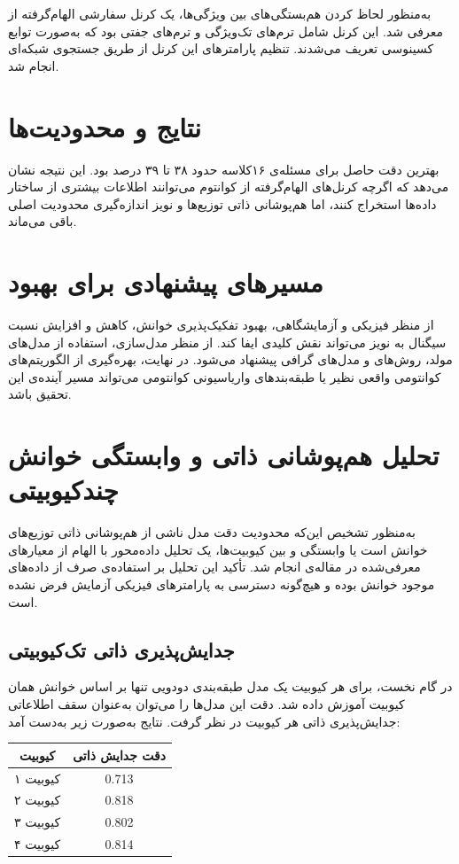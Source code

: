 به‌منظور لحاظ کردن هم‌بستگی‌های بین ویژگی‌ها، یک کرنل سفارشی الهام‌گرفته از  معرفی شد. این کرنل شامل ترم‌های تک‌ویژگی و ترم‌های جفتی بود که به‌صورت توابع کسینوسی تعریف می‌شدند. تنظیم پارامترهای این کرنل از طریق جستجوی شبکه‌ای انجام شد.

\section{نتایج و محدودیت‌ها}
بهترین دقت حاصل برای مسئله‌ی ۱۶کلاسه حدود ۳۸ تا ۳۹ درصد بود. این نتیجه نشان می‌دهد که اگرچه کرنل‌های الهام‌گرفته از کوانتوم می‌توانند اطلاعات بیشتری از ساختار داده‌ها استخراج کنند، اما هم‌پوشانی ذاتی توزیع‌ها و نویز اندازه‌گیری محدودیت اصلی باقی می‌ماند.

\section{مسیرهای پیشنهادی برای بهبود}
از منظر فیزیکی و آزمایشگاهی، بهبود تفکیک‌پذیری خوانش، کاهش  و افزایش نسبت سیگنال به نویز می‌تواند نقش کلیدی ایفا کند. از منظر مدل‌سازی، استفاده از مدل‌های مولد، روش‌های  و مدل‌های گرافی پیشنهاد می‌شود. در نهایت، بهره‌گیری از الگوریتم‌های کوانتومی واقعی نظیر  یا طبقه‌بندهای واریاسیونی کوانتومی می‌تواند مسیر آینده‌ی این تحقیق باشد.


\section{تحلیل هم‌پوشانی ذاتی و وابستگی خوانش چندکیوبیتی}
به‌منظور تشخیص این‌که محدودیت دقت مدل ناشی از هم‌پوشانی ذاتی توزیع‌های خوانش است یا وابستگی و  بین کیوبیت‌ها، یک تحلیل داده‌محور با الهام از معیارهای معرفی‌شده در مقاله‌ی
انجام شد. تأکید این تحلیل بر استفاده‌ی صرف از داده‌های موجود خوانش بوده و هیچ‌گونه دسترسی به پارامترهای فیزیکی آزمایش فرض نشده است.

\subsection{جدایش‌پذیری ذاتی تک‌کیوبیتی}
در گام نخست، برای هر کیوبیت یک مدل طبقه‌بندی دودویی تنها بر اساس خوانش همان کیوبیت آموزش داده شد. دقت این مدل‌ها را می‌توان به‌عنوان سقف اطلاعاتی جدایش‌پذیری ذاتی هر کیوبیت در نظر گرفت. نتایج به‌صورت زیر به‌دست آمد:
\begin{center}
	\begin{tabular}{c c}
		\hline
		کیوبیت & دقت جدایش ذاتی \\
		\hline
		کیوبیت ۱ & 0.713 \\
		کیوبیت ۲ & 0.818 \\
		کیوبیت ۳ & 0.802 \\
		کیوبیت ۴ & 0.814 \\
		\hline
	\end{tabular}
\end{center}

